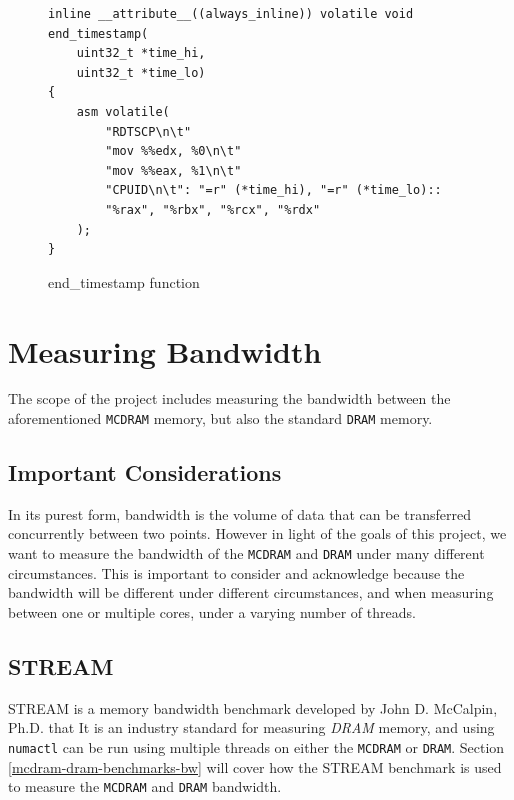 \documentclass[bsc,frontabs,twoside,singlespacing,parskip,deptreport]{infthesis}     %
\begin{document}
\begin{figure}[h!]
    \centering
    \begin{verbatim}
inline __attribute__((always_inline)) volatile void end_timestamp(
    uint32_t *time_hi,
    uint32_t *time_lo)
{
    asm volatile(
        "RDTSCP\n\t"
        "mov %%edx, %0\n\t"
        "mov %%eax, %1\n\t"
        "CPUID\n\t": "=r" (*time_hi), "=r" (*time_lo)::
        "%rax", "%rbx", "%rcx", "%rdx"
    );
}
    \end{verbatim}
    \caption{end\_timestamp function}
    \label{fig:endtimestamp-code}
\end{figure}

\newpage
\section{Measuring Bandwidth}
The scope of the project includes measuring the bandwidth between the aforementioned \texttt{MCDRAM} memory, but also the standard \texttt{DRAM} memory.

\subsection{Important Considerations}\label{bandwidth_considerations}
In its purest form, bandwidth is the volume of data that can be transferred concurrently between two points. However in light of the goals of this project, we want to measure the bandwidth of the \texttt{MCDRAM} and \texttt{DRAM} under many different circumstances. This is important to consider and acknowledge because the bandwidth will be different under different circumstances, and when measuring between one or multiple cores, under a varying number of threads.

\subsection{STREAM\cite{McCalpin1995}}
STREAM is a memory bandwidth benchmark developed by John D. McCalpin, Ph.D. that \cite{STREAM_FAQ} It is an industry standard for measuring \textit{DRAM} memory, and using \texttt{numactl}\cite{numactl_repo}\cite{numactl_man} can be run using multiple threads on either the \texttt{MCDRAM} or \texttt{DRAM}. Section \ref{mcdram-dram-benchmarks-bw} will cover how the STREAM benchmark is used to measure the \texttt{MCDRAM} and \texttt{DRAM} bandwidth.
\end{document}
